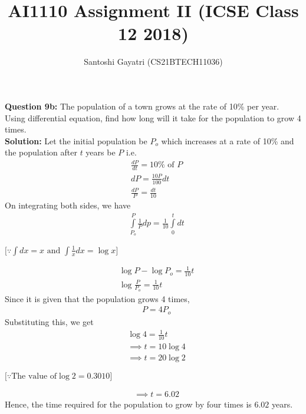 \documentclass[journal,12pt,twocolumn]{IEEEtran}
\title{AI1110 Assignment II (ICSE Class 12 2018)}
\author{Santoshi Gayatri (CS21BTECH11036)}
\begin{document}
\maketitle
\textbf {Question 9b:}
The population of a town grows at the rate of 10\% per year. Using differential equation, find how long will it take for the population to grow 4 times.\\

\textbf{Solution:}
Let the initial population be $P_o$ which increases at a rate of 10\% and the population after $t$ years be $P$ i.e.
\begin{align}
& {\displaystyle \frac{dP}{dt} = 10\% \mbox{ of } P}\\[6pt]
& {dP =\displaystyle \frac{10P}{100}dt }\\[10pt]
& {\displaystyle \frac{dP}{P} = \frac{dt}{10}}
\end{align}
On integrating both sides, we have 
\begin{align}
& {\displaystyle { \int\limits_{P_o}^{P} \frac{1}{P} dp = \frac {1}{10} \int\limits_{0}^{t}dt}}
\end{align}
\begin{center}
$ \Big [\because \int dx = x  \mbox{ and } \displaystyle{\int\displaystyle \frac{1}{x}dx} = \log x  \Big ] $
\end{center}
\begin{align}
& {\log P - \log P_o = \frac{1}{10}t }\\
&{ \log \frac{P}{P_o} = \frac{1}{10}t }
\end{align}
Since it is given that the population grows 4 times, 
\begin{align}
&{P = 4P_o}
\end{align}
Substituting this, we get
\begin{align}
& {\log 4 =\displaystyle \frac {1}{10}t}\\[8pt]
& {\implies t= 10 \log 4 }\\[8pt]
& {\implies t = 20\log 2 }
\end{align}
\begin{center}
$ \Big[\because \mbox {The value of} \log 2 = 0.3010\Big] $\\
\end{center}
\begin{align}
& {\implies t = 6.02} 
\end{align}
Hence, the time required for the population to grow by four times is \underline{$6.02$} years.
\end{document}
